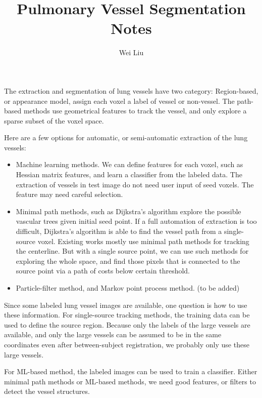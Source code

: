 \documentclass[12pt]{article}
\begin{document}
\title{Pulmonary Vessel Segmentation Notes}
\author{Wei Liu}
\maketitle

The extraction and segmentation of lung vessels have two category: Region-based,
or appearance model, assign each voxel a label of vessel or non-vessel. The
path-based methods use geometrical features to track the vessel, and only
explore a sparse subset of the voxel space.

Here are a few options for automatic, or semi-automatic extraction of the lung vessels:

\begin{itemize}
  \item Machine learning methods. We can define features for each voxel, such as
    Hessian matrix features, and learn a classifier from the labeled data. The
    extraction of vessels in test image do not need user input of seed
    voxels. The feature may need careful selection.

  \item Minimal path methods, such as Dijkstra's algorithm explore the possible
    vascular trees given initial seed point. If a full automation of extraction
    is too difficult, Dijkstra's algorithm is able to find the vessel path from
    a single-source voxel. Existing works mostly use minimal path methods for
    tracking the centerline. But with a single source point, we can use such
    methods for exploring the whole space, and find those pixels that is
    connected to the source point via a path of costs below certain threshold.
    
  \item Particle-filter method, and Markov point process method. (to be added)
\end{itemize}

Since some labeled lung vessel images are available, one question is how to
use these information. For single-source tracking methods, the training data
can be used to define the source region. Because only the labels of the large
vessels are available, and only the large vessels can be assumed to be in the
same coordinates even after between-subject registration, we probably only use
these large vessels.

For ML-based method, the labeled images can be used to train a
classifier. Either minimal path methods or ML-based methods, we need good
features, or filters to detect the vessel structures.
\end{document}
